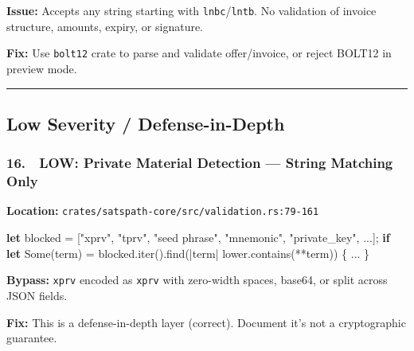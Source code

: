\documentclass[
]{article}
\newenvironment{Shaded}{}{}
\newcommand{\ConstantTok}[1]{\textcolor[rgb]{0.53,0.00,0.00}{#1}}
\newcommand{\ControlFlowTok}[1]{\textcolor[rgb]{0.00,0.44,0.13}{\textbf{#1}}}
\newcommand{\KeywordTok}[1]{\textcolor[rgb]{0.00,0.44,0.13}{\textbf{#1}}}
\newcommand{\NormalTok}[1]{#1}
\newcommand{\OperatorTok}[1]{\textcolor[rgb]{0.40,0.40,0.40}{#1}}
\newcommand{\StringTok}[1]{\textcolor[rgb]{0.25,0.44,0.63}{#1}}
\begin{document}
\textbf{Issue:} Accepts any string starting with
\texttt{lnbc}/\texttt{lntb}. No validation of invoice structure,
amounts, expiry, or signature.

\textbf{Fix:} Use \texttt{bolt12} crate to parse and validate
offer/invoice, or reject BOLT12 in preview mode.

\begin{center}\rule{0.5\linewidth}{0.5pt}\end{center}

\hypertarget{low-severity-defense-in-depth}{%
\subsection{Low Severity /
Defense-in-Depth}\label{low-severity-defense-in-depth}}

\hypertarget{low-private-material-detection-string-matching-only}{%
\subsubsection{16. 🔵 LOW: Private Material Detection --- String
Matching
Only}\label{low-private-material-detection-string-matching-only}}

\textbf{Location:}
\texttt{crates/satspath-core/src/validation.rs:79-161}

\begin{Shaded}
\begin{Highlighting}[]
\KeywordTok{let}\NormalTok{ blocked }\OperatorTok{=}\NormalTok{ [}\StringTok{"xprv"}\OperatorTok{,} \StringTok{"tprv"}\OperatorTok{,} \StringTok{"seed phrase"}\OperatorTok{,} \StringTok{"mnemonic"}\OperatorTok{,} \StringTok{"private\_key"}\OperatorTok{,} \OperatorTok{...}\NormalTok{]}\OperatorTok{;}
\ControlFlowTok{if} \KeywordTok{let} \ConstantTok{Some}\NormalTok{(term) }\OperatorTok{=}\NormalTok{ blocked}\OperatorTok{.}\NormalTok{iter()}\OperatorTok{.}\NormalTok{find(}\OperatorTok{|}\NormalTok{term}\OperatorTok{|}\NormalTok{ lower}\OperatorTok{.}\NormalTok{contains(}\OperatorTok{**}\NormalTok{term)) }\OperatorTok{\{} \OperatorTok{...} \OperatorTok{\}}
\end{Highlighting}
\end{Shaded}

\textbf{Bypass:} \texttt{xprv} encoded as \texttt{xprv} with zero-width
spaces, base64, or split across JSON fields.

\textbf{Fix:} This is a defense-in-depth layer (correct). Document it's
not a cryptographic guarantee.
\end{document}
